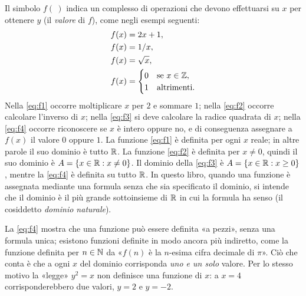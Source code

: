 Il simbolo $f(\ )$ indica un complesso di operazioni che devono effettuarsi su $x$ per
ottenere $y$ (il \emph{valore} di $f$), come negli esempi seguenti:
\begin{align}
  f(x)&=2x+1, \label{eq:f1}\\
  f(x)&=1/x, \label{eq:f2}\\
  f(x)&=\sqrt{x}, \label{eq:f3}\\
  f(x)&=\begin{cases}0 & \text{se } x\in\mathbb{Z},\\ 1 & \text{altrimenti.}\end{cases}\label{eq:f4}
\end{align}
Nella \eqref{eq:f1} occorre moltiplicare $x$ per $2$ e sommare $1$; nella \eqref{eq:f2}
occorre calcolare l'inverso di $x$; nella \eqref{eq:f3} si deve calcolare la radice
quadrata di $x$; nella \eqref{eq:f4} occorre riconoscere se $x$ è intero oppure no, e di
conseguenza assegnare a $f(x)$ il valore $0$ oppure $1$.
La funzione \eqref{eq:f1} è definita per ogni $x$ reale; in altre parole il suo dominio è
tutto $\mathbb{R}$. La funzione \eqref{eq:f2} è definita per $x\neq0$, quindi il suo dominio è
$A=\{x\in\mathbb{R} : x\neq0\}$. Il dominio della \eqref{eq:f3} è $A=\{x\in\mathbb{R} : x\ge0\}$,
mentre la \eqref{eq:f4} è definita su tutto $\mathbb{R}$. In questo libro, quando una funzione è
assegnata mediante una formula senza che sia specificato il dominio, si intende che il
dominio è il più grande sottoinsieme di $\mathbb{R}$ in cui la formula ha senso (il cosiddetto
\emph{dominio naturale}).

\begin{attenzione}
La \eqref{eq:f4} mostra che una funzione può essere definita «a pezzi», senza una
formula unica; esistono funzioni definite in modo ancora più indiretto, come la funzione
definita per $n\in\mathbb{N}$ da «$f(n)$ è la $n$-esima cifra decimale di $\pi$». Ciò che conta è che a ogni $x$ del dominio
corrisponda \emph{uno e un solo} valore. Per lo stesso motivo la «legge» $y^{2}=x$ non
definisce una funzione di $x$: a $x=4$ corrisponderebbero due valori, $y=2$ e $y=-2$.
\end{attenzione}


